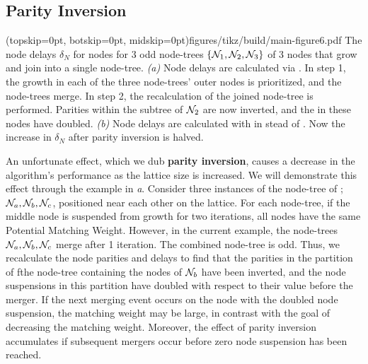 \subsection{Parity Inversion}\label{sec:inversion}

\Figure[tb](topskip=0pt, botskip=0pt, midskip=0pt){figures/tikz/build/main-figure6.pdf}{
    The node delays $\delta_N$ for nodes for 3 odd node-trees $\{\mathcal{N}_1, \mathcal{N}_2, \mathcal{N}_3\}$ of 3 nodes that grow and join into a single node-tree. \emph{(a)} Node delays are calculated via . In step 1, the growth in each of the three node-trees' outer nodes is prioritized, and the node-trees merge. In step 2, the recalculation of the joined node-tree is performed. Parities within the subtree of $\mathcal{N}_2$ are now inverted, and the  in these nodes have doubled. \emph{(b)} Node delays are calculated with  in stead of . Now the increase in $\delta_N$ after parity inversion is halved.\label{fig:partialdfs}}

An unfortunate effect, which we dub \textbf{parity inversion}, causes a decrease in the algorithm's performance as the lattice size is increased. We will demonstrate this effect through the example in \emph{a}. Consider three instances of the node-tree of ; $\mathcal{N}_a, \mathcal{N}_b, \mathcal{N}_c$, positioned near each other on the lattice. For each node-tree, if the middle node is suspended from growth for two iterations, all nodes have the same Potential Matching Weight. However, in the current example, the node-trees $\mathcal{N}_a, \mathcal{N}_b, \mathcal{N}_c$ merge after 1 iteration. The combined node-tree is odd. Thus, we recalculate the node parities and delays to find that the parities in the partition of fthe node-tree containing the nodes of $\mathcal{N}_b$ have been inverted, and the node suspensions in this partition have doubled with respect to their value before the merger. If the next merging event occurs on the node with the doubled node suspension, the matching weight may be large, in contrast with the goal of decreasing the matching weight. Moreover, the effect of parity inversion accumulates if subsequent mergers occur before zero node suspension has been reached. %

